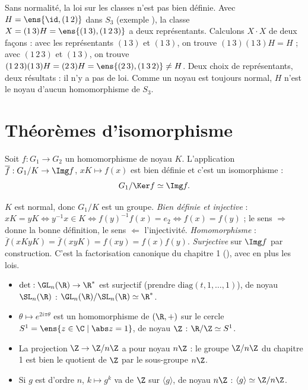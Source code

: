 \begin{essentiel}
Sans normalité, la \og loi \fg{} sur les classes n'est pas bien définie. Avec $H=\ens{\id,(1\,2)}$ dans $S_3$ (exemple ), la classe $X=(1\,3)H=\ens{(1\,3),(1\,2\,3)}$ a deux représentants. Calculons \og $X\cdot X$ \fg{} de deux façons : avec les représentants $(1\,3)$ et $(1\,3)$, on trouve $(1\,3)(1\,3)H=H$ ; avec $(1\,2\,3)$ et $(1\,3)$, on trouve $(1\,2\,3)(1\,3)H=(2\,3)H=\ens{(2\,3),(1\,3\,2)}\neq H$. Deux choix de représentants, deux résultats : il n'y a pas de loi. Comme un noyau est toujours normal, $H$ n'est le noyau d'aucun homomorphisme de $S_3$.
\end{essentiel}

\section{Théorèmes d'isomorphisme}
\begin{theoreme}\label{thm-iso1}
Soit $f:G_1\to G_2$ un homomorphisme de noyau $K$. L'application $\overline f:G_1/K\to\Img f$, $xK\mapsto f(x)$ est bien définie et c'est un isomorphisme :
\[G_1/\Ker f\simeq\Img f.\]
\end{theoreme}
\begin{preuve}
$K$ est normal, donc $G_1/K$ est un groupe. \emph{Bien définie et injective} : $xK=yK\iff y^{-1}x\in K\iff f(y)^{-1}f(x)=e_2\iff f(x)=f(y)$ ; le sens \og $\Rightarrow$ \fg{} donne la bonne définition, le sens \og $\Leftarrow$ \fg{} l'injectivité. \emph{Homomorphisme} : $\overline f(xKyK)=\overline f(xyK)=f(xy)=f(x)f(y)$. \emph{Surjective} sur $\Img f$ par construction. C'est la factorisation canonique du chapitre 1 (), avec en plus les lois.
\end{preuve}
\begin{exemple}
\begin{itemize}
\item $\det:\GL_n(\R)\to\R^*$ est surjectif (prendre $\mathrm{diag}(t,1,\dots,1)$), de noyau $\SL_n(\R)$ : $\GL_n(\R)/\SL_n(\R)\simeq\R^*$.
\item $\theta\mapsto e^{2i\pi\theta}$ est un homomorphisme de $(\R,+)$ sur le cercle $S^1=\ens{z\in\C\mid\abs z=1}$, de noyau $\Z$ : $\R/\Z\simeq S^1$.
\item La projection $\Z\to\Z/n\Z$ a pour noyau $n\Z$ : le groupe $\Z/n\Z$ du chapitre 1 est bien le quotient de $\Z$ par le sous-groupe $n\Z$.
\item Si $g$ est d'ordre $n$, $k\mapsto g^k$ va de $\Z$ sur $\langle g\rangle$, de noyau $n\Z$ : $\langle g\rangle\simeq\Z/n\Z$.
\end{itemize}
\end{exemple}
